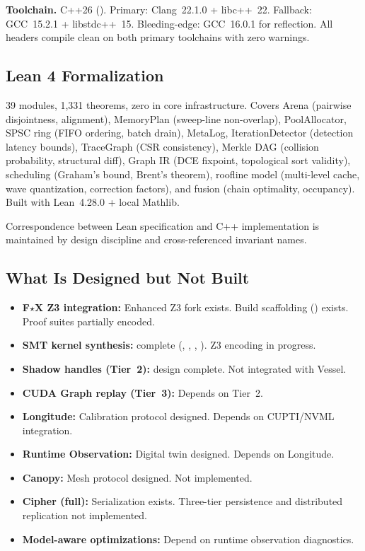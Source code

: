 \textbf{Toolchain.}
C++26 ().
Primary: Clang~22.1.0 + libc++~22.
Fallback: GCC~15.2.1 + libstdc++~15.
Bleeding-edge: GCC~16.0.1 for reflection.
All headers compile clean on both primary toolchains with zero warnings.

\subsection{Lean 4 Formalization}

39 modules, 1,331 theorems, zero  in core infrastructure.
Covers Arena (pairwise disjointness, alignment), MemoryPlan (sweep-line non-overlap), PoolAllocator, SPSC ring (FIFO ordering, batch drain), MetaLog, IterationDetector (detection latency bounds), TraceGraph (CSR consistency), Merkle DAG (collision probability, structural diff), Graph IR (DCE fixpoint, topological sort validity), scheduling (Graham's bound, Brent's theorem), roofline model (multi-level cache, wave quantization, correction factors), and fusion (chain optimality, occupancy).
Built with Lean~4.28.0 + local Mathlib.

Correspondence between Lean specification and C++ implementation is maintained by design discipline and cross-referenced invariant names.

\subsection{What Is Designed but Not Built}

\begin{itemize}
  \item \textbf{F$\star$X Z3 integration:} Enhanced Z3 fork exists. Build scaffolding () exists. Proof suites partially encoded.
  \item \textbf{SMT kernel synthesis:}  complete (, , , ). Z3 encoding in progress.
  \item \textbf{Shadow handles (Tier~2):}  design complete. Not integrated with Vessel.
  \item \textbf{CUDA Graph replay (Tier~3):} Depends on Tier~2.
  \item \textbf{Longitude:} Calibration protocol designed. Depends on CUPTI/NVML integration.
  \item \textbf{Runtime Observation:} Digital twin designed. Depends on Longitude.
  \item \textbf{Canopy:} Mesh protocol designed. Not implemented.
  \item \textbf{Cipher (full):} Serialization exists. Three-tier persistence and distributed replication not implemented.
  \item \textbf{Model-aware optimizations:} Depend on runtime observation diagnostics.
\end{itemize}

